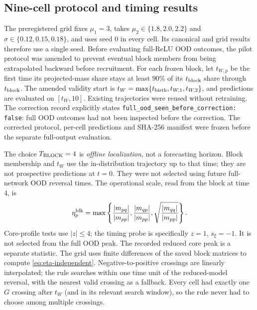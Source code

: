 \documentclass[10pt]{article}
\theoremstyle{remark}\newtheorem{remark}[theorem]{Remark}
\begin{document}
\subsection{Nine-cell protocol and timing results}
The preregistered grid fixes $\mu_1=3$, takes
$\mu_2\in\{1.8,2.0,2.2\}$ and $\sigma\in\{0.12,0.15,0.18\}$,
and uses seed $0$ in every cell. Its canonical and grid results therefore
use a single seed. Before evaluating full-ReLU OOD outcomes, the pilot
protocol was amended to prevent eventual block members from being
extrapolated backward before recruitment. For each frozen block, let
$t_{W,p}$ be the first time its projected-mass share stays at least
$90\%$ of its $t_{\rm block}$ share through $t_{\rm block}$.
The amended validity start is
$t_W=\max\{t_{\rm birth},t_{W,1},t_{W,2}\}$, and predictions are evaluated
on $[t_W,10]$. Existing trajectories were reused without retraining.
The correction record explicitly states
\texttt{full\_ood\_seen\_before\_correction: false}:
full OOD outcomes had not been inspected before the correction.
The corrected protocol, per-cell predictions and SHA-256 manifest were
frozen before the separate full-output evaluation.

The choice $T_{\rm BLOCK}=4$ is \emph{offline localization}, not a
forecasting horizon. Block membership and $t_W$ use the in-distribution
trajectory up to that time; they are not prospective predictions at $t=0$.
They were not selected using future full-network OOD reversal times.
The operational scale, read from the block at time $4$, is
\[
 \eta_p^{\rm blk}=\max\left\{
 \frac{|m_{pq}|}{|m_{pp}|},\frac{|m_{qp}|}{|m_{pp}|},
 \sqrt{\frac{|m_{qq}|}{|m_{pp}|}}\right\}.
\]
Core-profile tests use $|z|\le4$; the timing probe is specifically
$z=1$, $s_\xi=-1$. It is not selected from the full OOD peak.
The recorded reduced core peak is a separate statistic.
The grid uses finite differences of the saved block matrices to compute
\eqref{eq:eta-independent}. Negative-to-positive crossings are linearly
interpolated; the rule searches within one time unit of the reduced-model
reversal, with the nearest valid crossing as a fallback. Every cell had
exactly one $G$ crossing after $t_W$ (and in its relevant search window),
so the rule never had to choose among multiple crossings.
\end{document}

